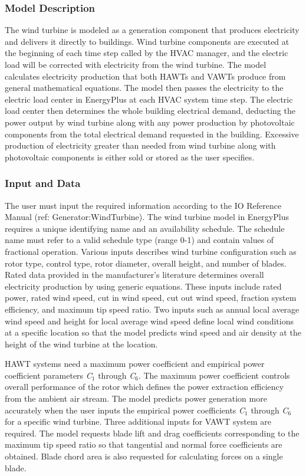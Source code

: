 \subsubsection{Model Description}\label{model-description-010}

The wind turbine is modeled as a generation component that produces electricity and delivers it directly to buildings. Wind turbine components are executed at the beginning of each time step called by the HVAC manager, and the electric load will be corrected with electricity from the wind turbine. The model calculates electricity production that both HAWTs and VAWTs produce from general mathematical equations. The model then passes the electricity to the electric load center in EnergyPlus at each HVAC system time step. The electric load center then determines the whole building electrical demand, deducting the power output by wind turbine along with any power production by photovoltaic components from the total electrical demand requested in the building. Excessive production of electricity greater than needed from wind turbine along with photovoltaic components is either sold or stored as the user specifies.

\subsubsection{Input and Data}\label{input-and-data}

The user must input the required information according to the IO Reference Manual (ref: Generator:WindTurbine). The wind turbine model in EnergyPlus requires a unique identifying name and an availability schedule. The schedule name must refer to a valid schedule type (range 0-1) and contain values of fractional operation. Various inputs describes wind turbine configuration such as rotor type, control type, rotor diameter, overall height, and number of blades. Rated data provided in the manufacturer's literature determines overall electricity production by using generic equations. These inputs include rated power, rated wind speed, cut in wind speed, cut out wind speed, fraction system efficiency, and maximum tip speed ratio. Two inputs such as annual local average wind speed and height for local average wind speed define local wind conditions at a specific location so that the model predicts wind speed and air density at the height of the wind turbine at the location.

HAWT systems need a maximum power coefficient and empirical power coefficient parameters \emph{C\(_{1}\)} through \emph{C\(_{6}\)}. The maximum power coefficient controls overall performance of the rotor which defines the power extraction efficiency from the ambient air stream. The model predicts power generation more accurately when the user inputs the empirical power coefficients \emph{C\(_{1}\)} through \emph{C\(_{6}\)} for a specific wind turbine. Three additional inputs for VAWT system are required. The model requests blade lift and drag coefficients corresponding to the maximum tip speed ratio so that tangential and normal force coefficients are obtained. Blade chord area is also requested for calculating forces on a single blade.

